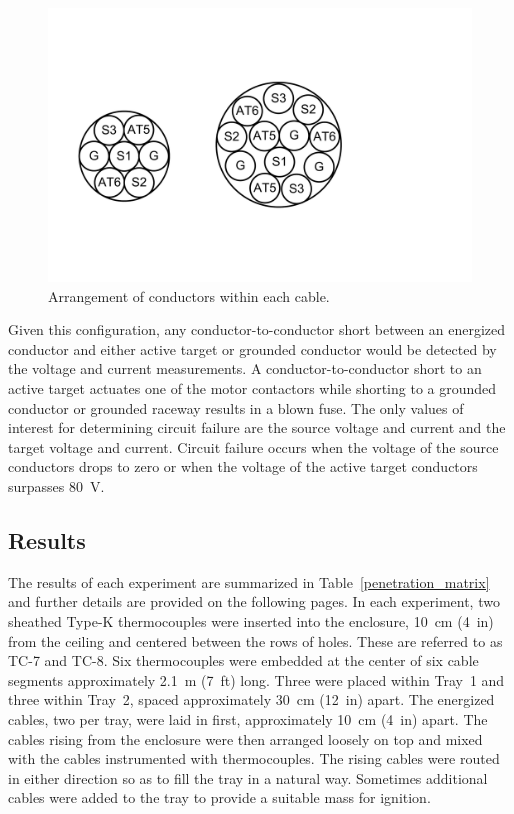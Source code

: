 \begin{figure}[ht]
\centering
\includegraphics[width=5.5in]{../FIGURES/Cable_Cross_Section}
\caption[Diagram of cable onductors]{Arrangement of conductors within each cable.}
\label{cable_cross_section}
\end{figure}

Given this configuration, any conductor-to-conductor short between an energized conductor and either active target or grounded conductor would be detected by the voltage and current measurements. A conductor-to-conductor short to an active target actuates one of the motor contactors while shorting to a grounded conductor or grounded raceway results in a blown fuse.  The only values of interest for determining circuit failure are the source voltage and current and the target voltage and current. Circuit failure occurs when the voltage of the source conductors drops to zero or when the voltage of the active target conductors surpasses 80~V.


\clearpage


\subsection{Results}

The results of each experiment are summarized in Table~\ref{penetration_matrix} and further details are provided on the following pages. In each experiment, two sheathed Type-K thermocouples were inserted into the enclosure, 10~cm (4~in) from the ceiling and centered between the rows of holes. These are referred to as TC-7 and TC-8. Six thermocouples were embedded at the center of six cable segments approximately 2.1~m (7~ft) long. Three were placed within Tray~1 and three within Tray~2, spaced approximately 30~cm (12~in) apart. The energized cables, two per tray, were laid in first, approximately 10~cm (4~in) apart. The cables rising from the enclosure were then arranged loosely on top and mixed with the cables instrumented with thermocouples. The rising cables were routed in either direction so as to fill the tray in a natural way. Sometimes additional cables were added to the tray to provide a suitable mass for ignition.


